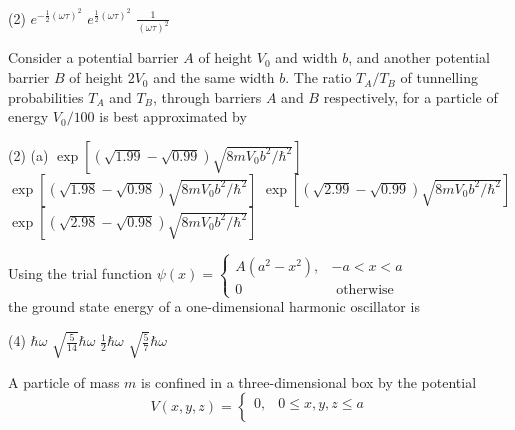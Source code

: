 \begin{enumerate}
\begin{minipage}{\textwidth}
\end{minipage}
\begin{tasks}(2)
	\task[\textbf{A.}] $e^{-\frac{1}{2}(\omega \tau)^{2}}$ 
	\task[\textbf{B.}] $e^{\frac{1}{2}(\omega \tau)^{2}}$
	\task[\textbf{D.}]$\frac{1}{(\omega \tau)^{2}}$
\end{tasks}
\begin{minipage}{\textwidth}
	\item Consider a potential barrier $A$ of height $V_{0}$ and width $b$, and another potential barrier $B$ of height $2 V_{0}$ and the same width $b$. The ratio $T_{A} / T_{B}$ of tunnelling probabilities $T_{A}$ and $T_{B}$, through barriers $A$ and $B$ respectively, for a particle of energy $V_{0} / 100$ is best approximated by
\end{minipage}
\begin{tasks}(2)
	\task[\textbf{A.}](a) $\exp \left[(\sqrt{1.99}-\sqrt{0.99}) \sqrt{8 m V_{0} b^{2} / \hbar^{2}}\right]$
	\task[\textbf{B.}]$\exp \left[(\sqrt{1.98}-\sqrt{0.98}) \sqrt{8 m V_{0} b^{2} / \hbar^{2}}\right]$
	\task[\textbf{C.}] $\exp \left[(\sqrt{2.99}-\sqrt{0.99}) \sqrt{8 m V_{0} b^{2} / \hbar^{2}}\right]$
	\task[\textbf{D.}]$\exp \left[(\sqrt{2.98}-\sqrt{0.98}) \sqrt{8 m V_{0} b^{2} / \hbar^{2}}\right]$
\end{tasks}
\begin{minipage}{\textwidth}
	\item  Using the trial function
	$\psi(x)=\left\{\begin{array}{cc}
	A\left(a^{2}-x^{2}\right), & -a<x<a \\
	0 & \text { otherwise }
	\end{array}\right.$\\
	the ground state energy of a one-dimensional harmonic oscillator is 
\end{minipage}
\begin{tasks}(4)
	\task[\textbf{A.}] $\hbar \omega$
	\task[\textbf{B.}] $\sqrt{\frac{5}{14}} \hbar \omega$
	\task[\textbf{C.}]$\frac{1}{2} \hbar \omega$
	\task[\textbf{D.}] $\sqrt{\frac{5}{7}} \hbar \omega$
\end{tasks}
\begin{minipage}{\textwidth}
	\item A particle of mass $m$ is confined in a three-dimensional box by the potential
	$$
	V(x, y, z)=\left\{\begin{array}{lc}
	0, & 0 \leq x, y, z \leq a \\

\end{array}$$
\end{minipage}
\end{enumerate}
